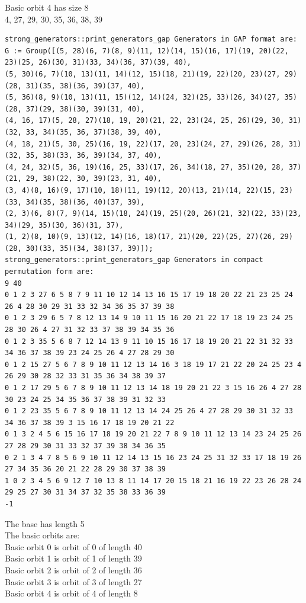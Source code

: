 \documentclass{article}
\begin{document}
{Basic orbit 4 has size 8\\
4, 27, 29, 30, 35, 36, 38, 39\\
\bigskip
\begin{verbatim}
strong_generators::print_generators_gap Generators in GAP format are:
G := Group([(5, 28)(6, 7)(8, 9)(11, 12)(14, 15)(16, 17)(19, 20)(22, 23)(25, 26)(30, 31)(33, 34)(36, 37)(39, 40), 
(5, 30)(6, 7)(10, 13)(11, 14)(12, 15)(18, 21)(19, 22)(20, 23)(27, 29)(28, 31)(35, 38)(36, 39)(37, 40), 
(5, 36)(8, 9)(10, 13)(11, 15)(12, 14)(24, 32)(25, 33)(26, 34)(27, 35)(28, 37)(29, 38)(30, 39)(31, 40), 
(4, 16, 17)(5, 28, 27)(18, 19, 20)(21, 22, 23)(24, 25, 26)(29, 30, 31)(32, 33, 34)(35, 36, 37)(38, 39, 40), 
(4, 18, 21)(5, 30, 25)(16, 19, 22)(17, 20, 23)(24, 27, 29)(26, 28, 31)(32, 35, 38)(33, 36, 39)(34, 37, 40), 
(4, 24, 32)(5, 36, 19)(16, 25, 33)(17, 26, 34)(18, 27, 35)(20, 28, 37)(21, 29, 38)(22, 30, 39)(23, 31, 40), 
(3, 4)(8, 16)(9, 17)(10, 18)(11, 19)(12, 20)(13, 21)(14, 22)(15, 23)(33, 34)(35, 38)(36, 40)(37, 39), 
(2, 3)(6, 8)(7, 9)(14, 15)(18, 24)(19, 25)(20, 26)(21, 32)(22, 33)(23, 34)(29, 35)(30, 36)(31, 37), 
(1, 2)(8, 10)(9, 13)(12, 14)(16, 18)(17, 21)(20, 22)(25, 27)(26, 29)(28, 30)(33, 35)(34, 38)(37, 39)]);
strong_generators::print_generators_gap Generators in compact permutation form are:
9 40
0 1 2 3 27 6 5 8 7 9 11 10 12 14 13 16 15 17 19 18 20 22 21 23 25 24 26 4 28 30 29 31 33 32 34 36 35 37 39 38 
0 1 2 3 29 6 5 7 8 12 13 14 9 10 11 15 16 20 21 22 17 18 19 23 24 25 28 30 26 4 27 31 32 33 37 38 39 34 35 36 
0 1 2 3 35 5 6 8 7 12 14 13 9 11 10 15 16 17 18 19 20 21 22 31 32 33 34 36 37 38 39 23 24 25 26 4 27 28 29 30 
0 1 2 15 27 5 6 7 8 9 10 11 12 13 14 16 3 18 19 17 21 22 20 24 25 23 4 26 29 30 28 32 33 31 35 36 34 38 39 37 
0 1 2 17 29 5 6 7 8 9 10 11 12 13 14 18 19 20 21 22 3 15 16 26 4 27 28 30 23 24 25 34 35 36 37 38 39 31 32 33 
0 1 2 23 35 5 6 7 8 9 10 11 12 13 14 24 25 26 4 27 28 29 30 31 32 33 34 36 37 38 39 3 15 16 17 18 19 20 21 22 
0 1 3 2 4 5 6 15 16 17 18 19 20 21 22 7 8 9 10 11 12 13 14 23 24 25 26 27 28 29 30 31 33 32 37 39 38 34 36 35 
0 2 1 3 4 7 8 5 6 9 10 11 12 14 13 15 16 23 24 25 31 32 33 17 18 19 26 27 34 35 36 20 21 22 28 29 30 37 38 39 
1 0 2 3 4 5 6 9 12 7 10 13 8 11 14 17 20 15 18 21 16 19 22 23 26 28 24 29 25 27 30 31 34 37 32 35 38 33 36 39 
-1
\end{verbatim}
The base has length 5\\
The basic orbits are: \\
Basic orbit 0 is orbit of 0 of length 40\\
Basic orbit 1 is orbit of 1 of length 39\\
Basic orbit 2 is orbit of 2 of length 36\\
Basic orbit 3 is orbit of 3 of length 27\\
Basic orbit 4 is orbit of 4 of length 8\\


}
\end{document}
